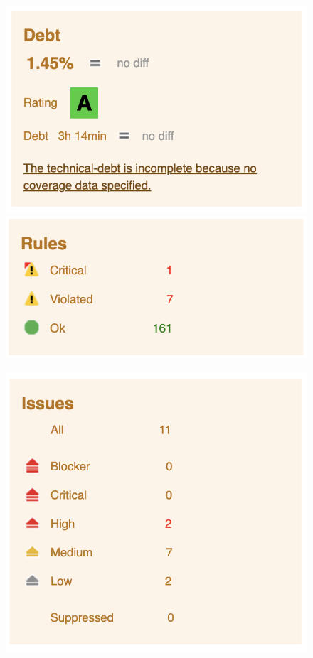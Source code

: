 \documentclass[12pt,a4paper,reqno]{report}
\begin{document}
\begin{figure}[h!]
    \centering
    \begin{minipage}[b]{0.42\textwidth}
        \includegraphics[width=\textwidth]{images/Technical-debt-estimation.png} \\[1ex]
        \includegraphics[width=\textwidth]{images/Rules.png}
    \end{minipage}
    \hspace{0.5ex}
    \begin{minipage}[b]{0.53\textwidth}
        \includegraphics[width=\textwidth]{images/Issues.png}

\end{minipage}
\end{figure}
\end{document}
